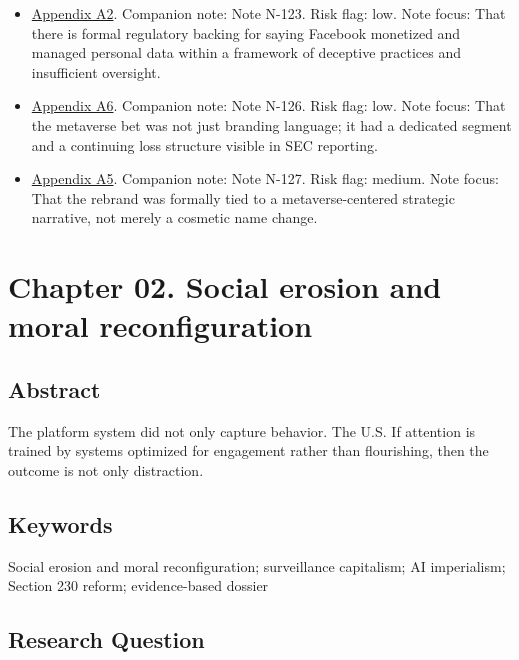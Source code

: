 \documentclass[
  american,
  11pt,
  letterpaper,
]{article}
\begin{document}
\begin{itemize}
  Peter Thiel's formal role at Facebook / Meta lasted well beyond the
  early startup period and remained active into 2022.
\item
  \hyperref[ch-01-appendix-a2-ftc-imposes-5-billion-penalty-and-sweeping-new-privacy-restrictions-on-facebook]{Appendix
  A2}. Companion note: Note N-123. Risk flag: low. Note focus: That
  there is formal regulatory backing for saying Facebook monetized and
  managed personal data within a framework of deceptive practices and
  insufficient oversight.
\item
  \hyperref[ch-01-appendix-a6-meta-platforms-inc-2023-annual-report-form-10-k]{Appendix
  A6}. Companion note: Note N-126. Risk flag: low. Note focus: That the
  metaverse bet was not just branding language; it had a dedicated
  segment and a continuing loss structure visible in SEC reporting.
\item
  \hyperref[ch-01-appendix-a5-the-facebook-company-is-now-meta]{Appendix
  A5}. Companion note: Note N-127. Risk flag: medium. Note focus: That
  the rebrand was formally tied to a metaverse-centered strategic
  narrative, not merely a cosmetic name change.
\end{itemize}

\newpage

\section{Chapter 02. Social erosion and moral
reconfiguration}\label{chapter-02.-social-erosion-and-moral-reconfiguration}

\subsection{Abstract}\label{abstract-2}

The platform system did not only capture behavior. The U.S. If attention
is trained by systems optimized for engagement rather than flourishing,
then the outcome is not only distraction.

\subsection{Keywords}\label{keywords-2}

Social erosion and moral reconfiguration; surveillance capitalism; AI
imperialism; Section 230 reform; evidence-based dossier

\subsection{Research Question}\label{research-question-2}
\end{document}
